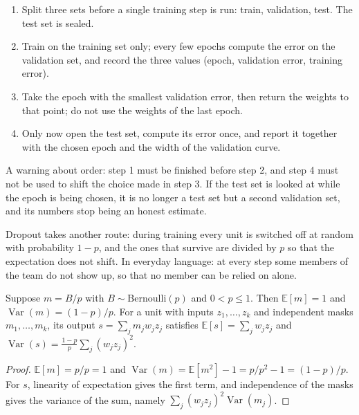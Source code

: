 \begin{resep}
\begin{enumerate}
  \item Split three sets before a single training step is run: train, validation,
        test. The test set is sealed.
  \item Train on the training set only; every few epochs compute the error on the
        validation set, and record the three values (epoch, validation error,
        training error).
  \item Take the epoch with the smallest validation error, then return the weights to
        that point; do not use the weights of the last epoch.
  \item Only now open the test set, compute its error once, and report it together
        with the chosen epoch and the width of the validation curve.
\end{enumerate}
A warning about order: step 1 must be finished before step 2, and step 4 must not be
used to shift the choice made in step 3. If the test set is looked at while the epoch
is being chosen, it is no longer a test set but a second validation set, and its
numbers stop being an honest estimate.
\end{resep}

Dropout takes another route: during training every unit is switched off at random
with probability $1-p$, and the ones that survive are divided by $p$ so that the
expectation does not shift. In everyday language: at every step some members of the
team do not show up, so that no member can be relied on alone.

\begin{lemma}
Suppose $m=B/p$ with $B\sim\mathrm{Bernoulli}(p)$ and $0<p\le1$. Then
$\mathbb{E}[m]=1$ and $\operatorname{Var}(m)=(1-p)/p$. For a unit with inputs
$z_1,\dots,z_k$ and independent masks $m_1,\dots,m_k$, its output
$s=\sum_j m_jw_jz_j$ satisfies $\mathbb{E}[s]=\sum_jw_jz_j$ and
$\operatorname{Var}(s)=\frac{1-p}{p}\sum_j(w_jz_j)^2$.
\end{lemma}

\begin{proof}[Proof]
$\mathbb{E}[m]=p/p=1$ and $\operatorname{Var}(m)=\mathbb{E}[m^2]-1=p/p^2-1=(1-p)/p$.
For $s$, linearity of expectation gives the first term, and independence of the masks
gives the variance of the sum, namely $\sum_j(w_jz_j)^2\operatorname{Var}(m_j)$.
\end{proof}

